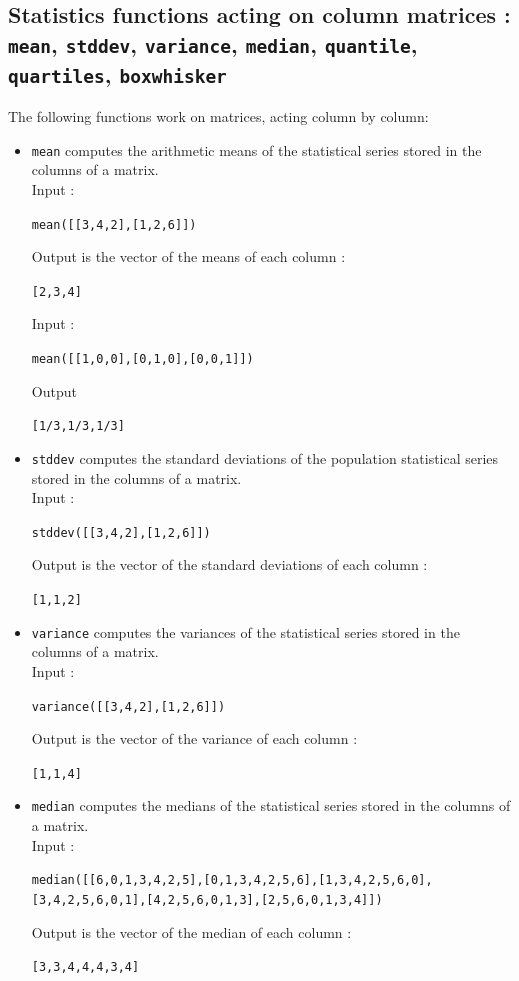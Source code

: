 \documentclass[a4paper,11pt]{book}
\begin{document}
\subsection{Statistics functions acting on column matrices : {\tt mean}, {\tt stddev}, {\tt variance}, {\tt median}, {\tt quantile}, {\tt quartiles}, {\tt boxwhisker}}\label{sec:statmat}
 
The following functions work on matrices, acting column by column:
\begin{itemize}
\item{\tt mean} computes the arithmetic means of the statistical series
stored in the columns of a matrix.\\ 
Input :
\begin{center}{\tt mean([[3,4,2],[1,2,6]])}\end{center}
Output is the vector of the means of each column :
\begin{center}{\tt  [2,3,4]}\end{center}
Input :
\begin{center}{\tt mean([[1,0,0],[0,1,0],[0,0,1]])}\end{center}
Output 
\begin{center}{\tt [1/3,1/3,1/3]}\end{center}

\item{\tt stddev} computes the standard deviations of the population
statistical series stored in the columns of a matrix.\\  
Input :
\begin{center}{\tt stddev([[3,4,2],[1,2,6]])}\end{center}
Output is the vector of the standard deviations of each column :
\begin{center}{\tt [1,1,2]}\end{center}
\item{\tt variance} computes the variances of the statistical series
stored in the columns of a matrix.\\ 
Input :
\begin{center}{\tt variance([[3,4,2],[1,2,6]])}\end{center}
Output is the vector of the variance of each column :
\begin{center}{\tt [1,1,4]}\end{center}

\item{\tt median} computes the medians of the statistical series
stored in the columns of a matrix.\\ 
Input :
\begin{center}{\tt median([[6,0,1,3,4,2,5],[0,1,3,4,2,5,6],[1,3,4,2,5,6,0], [3,4,2,5,6,0,1],[4,2,5,6,0,1,3],[2,5,6,0,1,3,4]])}\end{center}
Output is the vector of the median of each column  :
\begin{center}{\tt [3,3,4,4,4,3,4]}\end{center}


\end{itemize}
\end{document}
